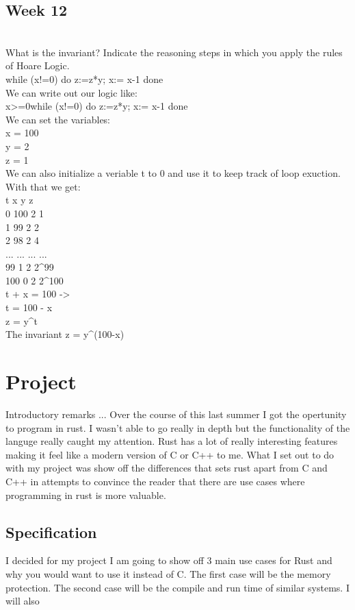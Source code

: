 \documentclass{article}
\theoremstyle{theorem}
\theoremstyle{definition}
\theoremstyle{remark}
\begin{document}
\subsection{Week 12}
\\What is the invariant? Indicate the reasoning steps in which you apply the rules of Hoare Logic.
\\while (x!=0) do z:=z*y;  x:= x-1 done
\\We can write out our logic like:
\\{x>=0}while (x!=0) do z:=z*y;  x:= x-1 done
\\We can set the variables:
\\x = 100
\\y = 2
\\z = 1
\\We can also initialize a veriable t to 0 and use it to keep track of loop exuction.
\\With that we get:
\\t     x     y     z
\\0     100   2     1
\\1     99    2     2
\\2     98    2     4
\\...   ...   ...   ...
\\99    1     2     2^99
\\100   0     2     2^100
\\t + x = 100 ->
\\t = 100 - x
\\z = y^t
\\The invariant z = y^(100-x)


\section{Project}
Introductory remarks ...
Over the course of this last summer I got the opertunity to program in rust. I wasn't able to go really in depth but the functionality of the languge really caught my attention.
Rust has a lot of really interesting features making it feel like a modern version of C or C++ to me. What I set out to do with my project was 
show off the differences that sets rust apart from C and C++ in attempts to convince the reader that there are use cases where programming in rust is more valuable.

\subsection{Specification}
I decided for my project I am going to show off 3 main use cases for Rust and why you would want to use it instead of C. The first case will be 
the memory protection. The second case will be the compile and run time of similar systems. I will also 
\end{document}
